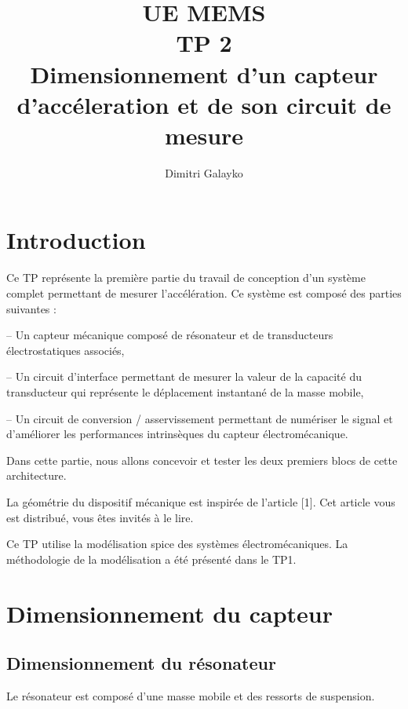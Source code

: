 \documentclass[12pt,A4,onecolumn,french]{article}
\begin{document}
\thispagestyle{empty} %



\date{}


\title{ UE MEMS \\ TP 2 \\ Dimensionnement d'un capteur d'accéleration et de son circuit de mesure}


\author{\hspace{1cm}Dimitri Galayko}

\pagestyle{empty}


\maketitle





\section{Introduction}
Ce TP représente la première partie du travail de conception d'un système complet permettant de mesurer l'accélération. Ce système est composé des parties suivantes : 

-- Un capteur mécanique composé de résonateur et de transducteurs électrostatiques associés, 

-- Un circuit d'interface permettant de mesurer la valeur de la capacité du transducteur qui représente le déplacement instantané de la masse mobile, 

-- Un circuit de conversion / asservissement permettant de numériser le signal et d'améliorer les performances intrinsèques du capteur électromécanique.  

Dans cette partie, nous allons concevoir et tester les deux premiers blocs de cette architecture. 

La géométrie du dispositif mécanique est inspirée de l'article [1]. Cet article vous est distribué, vous êtes invités à le lire. 

Ce TP utilise la modélisation spice des systèmes électromécaniques. La méthodologie de la modélisation a été présenté dans le TP1. 

\section{Dimensionnement du capteur}

\subsection{Dimensionnement du résonateur}
Le résonateur est composé d'une masse mobile et des ressorts de suspension. 
\end{document}
